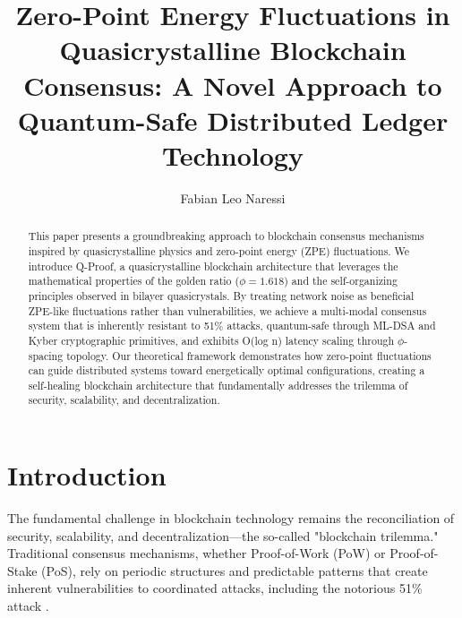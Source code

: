 \documentclass[AMA]{WileyNJD-AMA}
\begin{document}
\title{Zero-Point Energy Fluctuations in Quasicrystalline Blockchain Consensus: A Novel Approach to Quantum-Safe Distributed Ledger Technology}

\author{%
    Fabian Leo Naressi%
}


\begin{abstract}
This paper presents a groundbreaking approach to blockchain consensus mechanisms inspired by quasicrystalline physics and zero-point energy (ZPE) fluctuations. We introduce Q-Proof, a quasicrystalline blockchain architecture that leverages the mathematical properties of the golden ratio ($\phi = 1.618$) and the self-organizing principles observed in bilayer quasicrystals. By treating network noise as beneficial ZPE-like fluctuations rather than vulnerabilities, we achieve a multi-modal consensus system that is inherently resistant to 51\% attacks, quantum-safe through ML-DSA and Kyber cryptographic primitives, and exhibits O(log n) latency scaling through $\phi$-spacing topology. Our theoretical framework demonstrates how zero-point fluctuations can guide distributed systems toward energetically optimal configurations, creating a self-healing blockchain architecture that fundamentally addresses the trilemma of security, scalability, and decentralization.
\end{abstract}


\maketitle

\section{Introduction}

The fundamental challenge in blockchain technology remains the reconciliation of security, scalability, and decentralization---the so-called "blockchain trilemma." Traditional consensus mechanisms, whether Proof-of-Work (PoW) or Proof-of-Stake (PoS), rely on periodic structures and predictable patterns that create inherent vulnerabilities to coordinated attacks, including the notorious 51\% attack \cite{nakamoto2008}.
\end{document}
